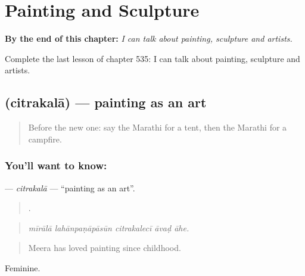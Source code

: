 
\chapter{Painting and Sculpture}
\label{ch:mr-painting-and-sculpture}

\begin{chapteropening}
\textbf{By the end of this chapter:} \emph{I can talk about painting, sculpture and artists.}

Complete the last lesson of chapter 535: I can talk about painting, sculpture and artists.
\end{chapteropening}

\section[\texorpdfstring{\mr{चित्रकला} (citrakalā)}{चित्रकला (citrakalā)}]{ (citrakalā) — painting as an art}

\label{lesson:MR-C535-citrakala}



\begin{quote}
Before the new one: say the Marathi for a tent, then the Marathi for a campfire.
\end{quote}

\subsection*{You'll want to know: }
\textbf{} — \emph{citrakalā} — \textquotedblleft{}painting as an art\textquotedblright{}.

\begin{quote}
    .
\end{quote}

\begin{quote}
\emph{mīrālā lahānpaṇāpāsūn citrakalecī āvaḍ āhe.}
\end{quote}

\begin{quote}
Meera has loved painting since childhood.
\end{quote}

Feminine.

